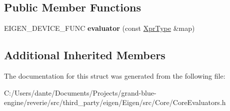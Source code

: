 \subsection*{Public Member Functions}
\begin{DoxyCompactItemize}
\item 
\mbox{\label{struct_eigen_1_1internal_1_1evaluator_3_01_map_3_01_plain_object_type_00_01_map_options_00_01_stride_type_01_4_01_4_a0a8ec07dfd1229d9e45bb3178ffc378c}} 
E\+I\+G\+E\+N\+\_\+\+D\+E\+V\+I\+C\+E\+\_\+\+F\+U\+NC {\bfseries evaluator} (const \mbox{\hyperlink{class_eigen_1_1_map}{Xpr\+Type}} \&map)
\end{DoxyCompactItemize}
\subsection*{Additional Inherited Members}


The documentation for this struct was generated from the following file\+:\begin{DoxyCompactItemize}
\item 
C\+:/\+Users/dante/\+Documents/\+Projects/grand-\/blue-\/engine/reverie/src/third\+\_\+party/eigen/\+Eigen/src/\+Core/Core\+Evaluators.\+h\end{DoxyCompactItemize}
